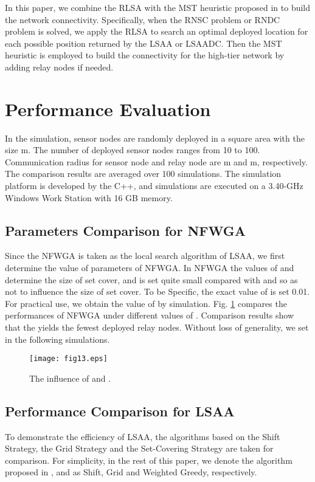 \documentclass[journal]{IEEEtran}
\begin{document}
In this paper, we combine the RLSA with the MST heuristic proposed in \cite{Lloyd07} to build the network connectivity. Specifically, when the RNSC problem or RNDC problem is solved, we apply the RLSA to search an optimal deployed location for each possible position returned by the LSAA or LSAADC. Then the MST heuristic is employed to build the connectivity for the high-tier network by adding relay nodes if needed.
\section{Performance Evaluation}
In the simulation, sensor nodes are randomly deployed in a square area with the size  m. The number of deployed sensor nodes  ranges from 10 to 100. Communication radius for sensor node and relay node are m and m, respectively. The comparison results are averaged over 100 simulations. The simulation platform is developed by the C++, and simulations are executed on a 3.40-GHz Windows Work Station with 16 GB memory.

\subsection{Parameters Comparison for NFWGA}
Since the NFWGA is taken as the local search algorithm of LSAA, we first determine the value of parameters of NFWGA. In NFWGA the values of  and  determine the size of set cover, and  is set quite small compared with  and  so as not to influence the size of set cover. To be Specific, the exact value of  is set 0.01. For practical use, we obtain the value of  by simulation.
Fig. \ref{fig13} compares the performances of NFWGA under different values of . Comparison results show that the  yields the fewest deployed relay nodes. Without loss of generality, we set  in the following simulations.

\begin{figure}
\begin{center}
\texttt{[image: fig13.eps]}    \caption{The influence of  and .}
\label{fig13}                                 \end{center}                                 \end{figure}

\subsection{Performance Comparison for LSAA}
To demonstrate the efficiency of LSAA, the algorithms based on the Shift Strategy, the Grid Strategy and the Set-Covering Strategy are taken for comparison. For simplicity, in the rest of this paper, we denote the algorithm proposed in \cite{Tang06}, \cite{Franceschetti01} and \cite{Ali11} as Shift, Grid and Weighted
Greedy, respectively.
\end{document}
